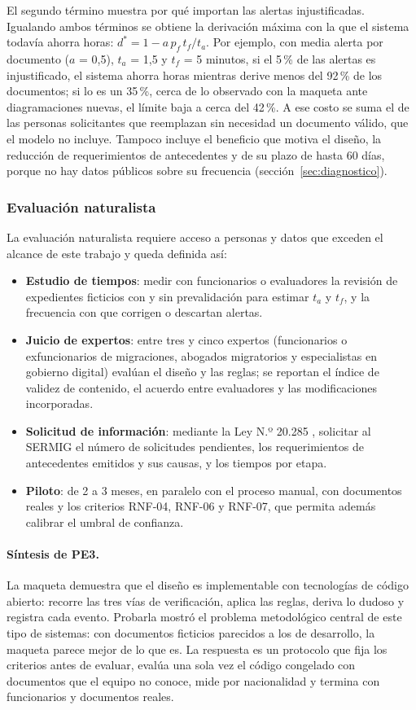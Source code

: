 \documentclass[11pt,a4paper]{article}
\begin{document}
El segundo término muestra por qué importan las alertas injustificadas. Igualando ambos términos se obtiene la derivación máxima con la que el sistema todavía ahorra horas: $d^{*} = 1 - a\,p_f\,t_f / t_a$. Por ejemplo, con media alerta por documento ($a$ = 0,5), $t_a$ = 1,5 y $t_f$ = 5 minutos, si el 5\,\% de las alertas es injustificado, el sistema ahorra horas mientras derive menos del 92\,\% de los documentos; si lo es un 35\,\%, cerca de lo observado con la maqueta ante diagramaciones nuevas, el límite baja a cerca del 42\,\%. A ese costo se suma el de las personas solicitantes que reemplazan sin necesidad un documento válido, que el modelo no incluye. Tampoco incluye el beneficio que motiva el diseño, la reducción de requerimientos de antecedentes y de su plazo de hasta 60 días, porque no hay datos públicos sobre su frecuencia (sección~\ref{sec:diagnostico}).

\subsubsection{Evaluación naturalista}
La evaluación naturalista requiere acceso a personas y datos que exceden el alcance de este trabajo y queda definida así:
\begin{itemize}
  \item \textbf{Estudio de tiempos}: medir con funcionarios o evaluadores la revisión de expedientes ficticios con y sin prevalidación para estimar $t_a$ y $t_f$, y la frecuencia con que corrigen o descartan alertas.
  \item \textbf{Juicio de expertos}: entre tres y cinco expertos (funcionarios o exfuncionarios de migraciones, abogados migratorios y especialistas en gobierno digital) evalúan el diseño y las reglas; se reportan el índice de validez de contenido, el acuerdo entre evaluadores y las modificaciones incorporadas.
  \item \textbf{Solicitud de información}: mediante la Ley N.º 20.285 \cite{ley20285}, solicitar al SERMIG el número de solicitudes pendientes, los requerimientos de antecedentes emitidos y sus causas, y los tiempos por etapa.
  \item \textbf{Piloto}: de 2 a 3 meses, en paralelo con el proceso manual, con documentos reales y los criterios RNF-04, RNF-06 y RNF-07, que permita además calibrar el umbral de confianza.
\end{itemize}

\paragraph{Síntesis de PE3.} La maqueta demuestra que el diseño es implementable con tecnologías de código abierto: recorre las tres vías de verificación, aplica las reglas, deriva lo dudoso y registra cada evento. Probarla mostró el problema metodológico central de este tipo de sistemas: con documentos ficticios parecidos a los de desarrollo, la maqueta parece mejor de lo que es. La respuesta es un protocolo que fija los criterios antes de evaluar, evalúa una sola vez el código congelado con documentos que el equipo no conoce, mide por nacionalidad y termina con funcionarios y documentos reales.
\end{document}
